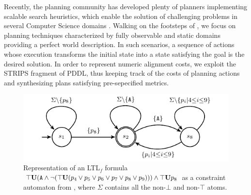 Recently, the planning community has developed plenty of planners implementing scalable search heuristics, which enable the solution of challenging problems in several Computer Science domains \cite{Marrella17}. Walking on the footsteps of \cite{MaggiMCA18}, we focus on planning techniques characterized by fully observable and static domains providing a perfect world description. In such scenarios, a sequence of actions whose execution transforms the initial state into a state satisfying the goal is the desired solution. In order to represent numeric alignment costs, we exploit the STRIPS fragment of PDDL, thus keeping track of the costs of planning actions and synthesizing plans satisfying pre-sepecified metrics.

\begin{figure}[!t]
	\centering
%
\includegraphics[scale=0.9]{images/example_3_graph}
	\caption{Representation of an LTL$_f$ formula $\top \mathbf{U}(\texttt{A}\wedge\neg(\top \mathbf{U}(p_4\vee p_5\vee p_6\vee p_7\vee p_8\vee p_9)))\wedge\top\mathbf{U} p_8$  as a constraint automaton from \cite{LeoniMA12,Westergaard11}, where $\Sigma$ contains all the non-$\bot$ and non-$\top$ atoms.}
	\label{fig:g1g2}
\end{figure}

